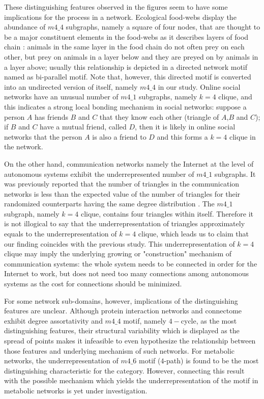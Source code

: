 \documentclass{article}
\begin{document}
These distinguishing features observed in the figures seem to have some implications for the process in a network. Ecological food-webs display the abundance of $m4\_4$ subgraphs, namely a square of four nodes, that are thought to be a major constituent elements in the food-webs as it describes layers of food chain \cite{Milo_motif,BiParallel}: animals in the same layer in the food chain do not often prey on each other, but prey on animals in a layer below and they are preyed on by animals in a layer above; usually this relationship is depicted in a directed network motif named as bi-parallel motif. Note that, however, this directed motif is converted into an undirected version of itself, namely $m4\_4$ in our study. Online social networks have an unusual number of $m4\_1$ subgraphs, namely $k = 4$ clique, and this indicates a strong local bonding mechanism in social networks: suppose a person $A$ has friends $B$ and $C$ that they know each other (triangle of $A$,$B$ and $C$); if $B$ and $C$ have a mutual friend, called $D$, then it is likely in online social networks that the person $A$ is also a friend to $D$ and this forms a $k=4$ clique in the network.  

On the other hand, communication networks namely the Internet at the level of autonomous systems exhibit the underrepresented number of  $m4\_1$ subgraphs. It was previously reported that the number of triangles in the communication networks is less than the expected value of the number of triangles for their randomized counterparts having the same degree distribution \cite{InternetClustering}. The $m4\_1$ subgraph, namely $k=4$ clique, contains four triangles within itself. Therefore it is not illogical to say that the underrepresentation of triangles approximately equals to the underrepresentation of $k=4$ clique, which leads us to claim that our finding coincides with the previous study. This underrepresentation of $k=4$ clique may imply the underlying growing or "construction" mechanism of communication systems: the whole system needs to be connected in order for the Internet to work, but does not need too many connections among autonomous systems as the cost for connections should be minimized. 

For some network sub-domains, however, implications of the distinguishing features are unclear. Although protein interaction networks and connectome exhibit degree assortativity and $m4\_4$ motif, namely $4-$cycle, as the most distinguishing features, their structural variability which is displayed as the spread of points makes it infeasible to even hypothesize the relationship between those features and underlying mechanism of such networks. For metabolic networks, the underrepresentation of $m4\_6$ motif ($4$-path) is found to be the most distinguishing characteristic for the category. However, connecting this result with the possible mechanism which yields the underrepresentation of the motif in metabolic networks is yet under investigation.
\end{document}
